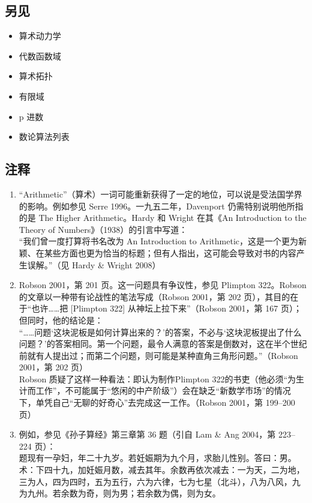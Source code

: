 \subsection{另见}
\begin{itemize}
\item 算术动力学
\item 代数函数域
\item 算术拓扑
\item 有限域
\item p 进数
\item 数论算法列表
\end{itemize}
\subsection{注释}
\begin{enumerate}
\item “Arithmetic”（算术）一词可能重新获得了一定的地位，可以说是受法国学界的影响。例如参见 Serre 1996。一九五二年，Davenport 仍需特别说明他所指的是 The Higher Arithmetic。Hardy 和 Wright 在其《An Introduction to the Theory of Numbers》（1938）的引言中写道：\\
“我们曾一度打算将书名改为 An Introduction to Arithmetic，这是一个更为新颖、在某些方面也更为恰当的标题；但有人指出，这可能会导致对书的内容产生误解。”（见 Hardy & Wright 2008）
\item Robson 2001，第 201 页。这一问题具有争议性，参见 Plimpton 322。Robson 的文章以一种带有论战性的笔法写成（Robson 2001，第 202 页），其目的在于“也许……把 [Plimpton 322] 从神坛上拉下来”（Robson 2001，第 167 页）；但同时，他的结论是：\\
“……问题‘这块泥板是如何计算出来的？’的答案，不必与‘这块泥板提出了什么问题？’的答案相同。第一个问题，最令人满意的答案是倒数对，这在半个世纪前就有人提出过；而第二个问题，则可能是某种直角三角形问题。”（Robson 2001，第 202 页）\\
Robson 质疑了这样一种看法：即认为制作Plimpton 322的书吏（他必须“为生计而工作”，不可能属于“悠闲的中产阶级”）会在缺乏“新数学市场”的情况下，单凭自己“无聊的好奇心”去完成这一工作。（Robson 2001，第 199–200 页）
\item 例如，参见《孙子算经》第三章第 36 题（引自 Lam & Ang 2004，第 223–224 页）：\\
[36] 题现有一孕妇，年二十九岁。若妊娠期为九个月，求胎儿性别。答曰：男。
术：下四十九，加妊娠月数，减去其年。余数再依次减去：一为天，二为地，三为人，四为四时，五为五行，六为六律，七为七星（北斗），八为八风，九为九州。若余数为奇，则为男；若余数为偶，则为女。\\

\end{enumerate}
